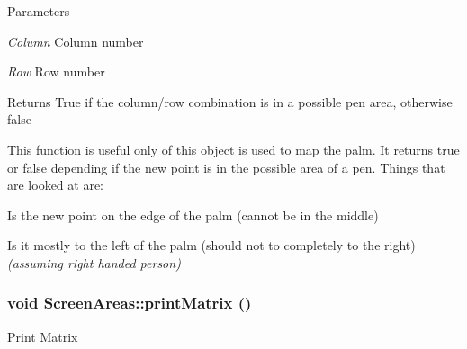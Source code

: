 \begin{DoxyParams}{Parameters}
\item[{\em Column}]Column number \item[{\em Row}]Row number\end{DoxyParams}
\begin{DoxyReturn}{Returns}
True if the column/row combination is in a possible pen area, otherwise false
\end{DoxyReturn}
This function is useful only of this object is used to map the palm. It returns true or false depending if the new point is in the possible area of a pen. Things that are looked at are:
\begin{DoxyItemize}
\item Is the new point on the edge of the palm (cannot be in the middle)
\item Is it mostly to the left of the palm (should not to completely to the right) {\itshape (assuming right handed person)\/} 
\end{DoxyItemize}\hypertarget{classScreenAreas_a2f083ce74c9d0178a84b9bb6c7b0cd69}{
\subsubsection[{printMatrix}]{\setlength{\rightskip}{0pt plus 5cm}void ScreenAreas::printMatrix ()}}
\label{classScreenAreas_a2f083ce74c9d0178a84b9bb6c7b0cd69}
Print Matrix

